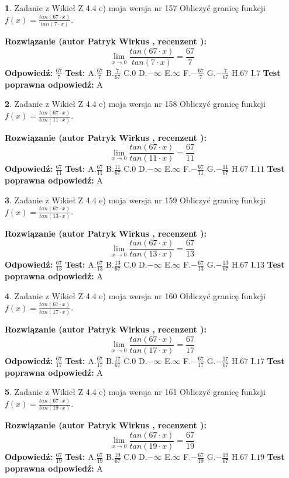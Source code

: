 \documentclass[12pt, a4paper]{article}
\theoremstyle{definition} %
\newtheorem{zad}{}
\newcommand{\zadStart}[1]{\begin{zad}#1\newline}
\newcommand{\zadStop}{\end{zad}}
\newcommand{\rozwStart}[2]{\noindent \textbf{Rozwiązanie (autor #1 , recenzent #2): }\newline}
\newcommand{\rozwStop}{\newline}
\newcommand{\odpStart}{\noindent \textbf{Odpowiedź:}\newline}
\newcommand{\odpStop}{\newline}
\newcommand{\testStart}{\noindent \textbf{Test:}\newline}
\newcommand{\testStop}{\newline}
\newcommand{\kluczStart}{\noindent \textbf{Test poprawna odpowiedź:}\newline}
\newcommand{\kluczStop}{\newline}
\begin{document}
\zadStart{Zadanie z Wikieł Z 4.4 e) moja wersja nr 157}
Obliczyć granicę funkcji $f(x)=\frac{tan(67\cdot x)}{tan(7\cdot x)}$.
\zadStop
\rozwStart{Patryk Wirkus}{}
$$\lim\limits_{x\to 0}\frac{tan(67\cdot x)}{tan(7\cdot x)}=
\frac{67}{7}$$
\rozwStop
\odpStart
$\frac{67}{7}$
\odpStop
\testStart
A.$\frac{67}{7}$
B.$\frac{7}{67}$
C.$0$
D.$-\infty$
E.$\infty$
F.$-\frac{67}{7}$
G.$-\frac{7}{67}$
H.$67$
I.$7$
\testStop
\kluczStart
A
\kluczStop



\zadStart{Zadanie z Wikieł Z 4.4 e) moja wersja nr 158}
Obliczyć granicę funkcji $f(x)=\frac{tan(67\cdot x)}{tan(11\cdot x)}$.
\zadStop
\rozwStart{Patryk Wirkus}{}
$$\lim\limits_{x\to 0}\frac{tan(67\cdot x)}{tan(11\cdot x)}=
\frac{67}{11}$$
\rozwStop
\odpStart
$\frac{67}{11}$
\odpStop
\testStart
A.$\frac{67}{11}$
B.$\frac{11}{67}$
C.$0$
D.$-\infty$
E.$\infty$
F.$-\frac{67}{11}$
G.$-\frac{11}{67}$
H.$67$
I.$11$
\testStop
\kluczStart
A
\kluczStop



\zadStart{Zadanie z Wikieł Z 4.4 e) moja wersja nr 159}
Obliczyć granicę funkcji $f(x)=\frac{tan(67\cdot x)}{tan(13\cdot x)}$.
\zadStop
\rozwStart{Patryk Wirkus}{}
$$\lim\limits_{x\to 0}\frac{tan(67\cdot x)}{tan(13\cdot x)}=
\frac{67}{13}$$
\rozwStop
\odpStart
$\frac{67}{13}$
\odpStop
\testStart
A.$\frac{67}{13}$
B.$\frac{13}{67}$
C.$0$
D.$-\infty$
E.$\infty$
F.$-\frac{67}{13}$
G.$-\frac{13}{67}$
H.$67$
I.$13$
\testStop
\kluczStart
A
\kluczStop



\zadStart{Zadanie z Wikieł Z 4.4 e) moja wersja nr 160}
Obliczyć granicę funkcji $f(x)=\frac{tan(67\cdot x)}{tan(17\cdot x)}$.
\zadStop
\rozwStart{Patryk Wirkus}{}
$$\lim\limits_{x\to 0}\frac{tan(67\cdot x)}{tan(17\cdot x)}=
\frac{67}{17}$$
\rozwStop
\odpStart
$\frac{67}{17}$
\odpStop
\testStart
A.$\frac{67}{17}$
B.$\frac{17}{67}$
C.$0$
D.$-\infty$
E.$\infty$
F.$-\frac{67}{17}$
G.$-\frac{17}{67}$
H.$67$
I.$17$
\testStop
\kluczStart
A
\kluczStop



\zadStart{Zadanie z Wikieł Z 4.4 e) moja wersja nr 161}
Obliczyć granicę funkcji $f(x)=\frac{tan(67\cdot x)}{tan(19\cdot x)}$.
\zadStop
\rozwStart{Patryk Wirkus}{}
$$\lim\limits_{x\to 0}\frac{tan(67\cdot x)}{tan(19\cdot x)}=
\frac{67}{19}$$
\rozwStop
\odpStart
$\frac{67}{19}$
\odpStop
\testStart
A.$\frac{67}{19}$
B.$\frac{19}{67}$
C.$0$
D.$-\infty$
E.$\infty$
F.$-\frac{67}{19}$
G.$-\frac{19}{67}$
H.$67$
I.$19$
\testStop
\kluczStart
A
\kluczStop
\end{document}
